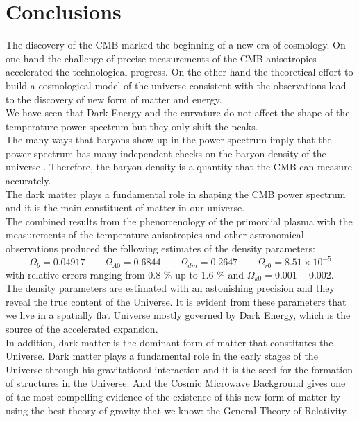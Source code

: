 \documentclass{article}
\begin{document}
\section{Conclusions}
The discovery of the CMB marked the beginning of a new era of cosmology.
On one hand the challenge of precise measurements of the CMB anisotropies accelerated the technological progress.
On the other hand the theoretical effort to build a cosmological model of the universe consistent with the observations lead to the discovery of new form of matter and energy.\\
We have seen that Dark Energy and the curvature do not affect the shape of the temperature power spectrum but they only shift the peaks.\\
The many ways that baryons show up in the power spectrum imply that the power spectrum has many independent checks on the baryon density of the universe \cite{huweb}.  
Therefore, the baryon density is a quantity that the CMB can measure accurately.\\
The dark matter plays a fundamental role in shaping the CMB power spectrum and it is the main constituent of matter in our universe.\\
The combined results from the phenomenology of the primordial plasma with the measurements of the temperature anisotropies and other astronomical observations produced the following estimates of the density parameters:
\begin{equation*}
    \Omega_{b} = 0.04917 
\qquad \Omega_{\Lambda 0} = 0.6844 \qquad \Omega_{dm} = 0.2647
\qquad \Omega_{r0} = 8.51 \times 10^{-5} 
\end{equation*}
with relative errors ranging from $0.8$ \% up to $1.6$ \% and $\Omega_{k0} = 0.001 \pm 0.002$.\\
The density parameters are estimated with an astonishing precision and they reveal the true content of the Universe.
It is evident from these parameters that we live in a spatially flat Universe mostly governed by Dark Energy, which is the source of the accelerated expansion.\\
In addition, dark matter is the dominant form of matter that constitutes the Universe.
Dark matter plays a fundamental role in the early stages of the Universe through his gravitational interaction and it is the seed for the formation of structures in the Universe.
And the Cosmic Microwave Background gives one of the most compelling evidence of the existence of this new form of matter by using the best theory of gravity that we know: the General Theory of Relativity.
\pagebreak











\nocite{*}



\end{document}
